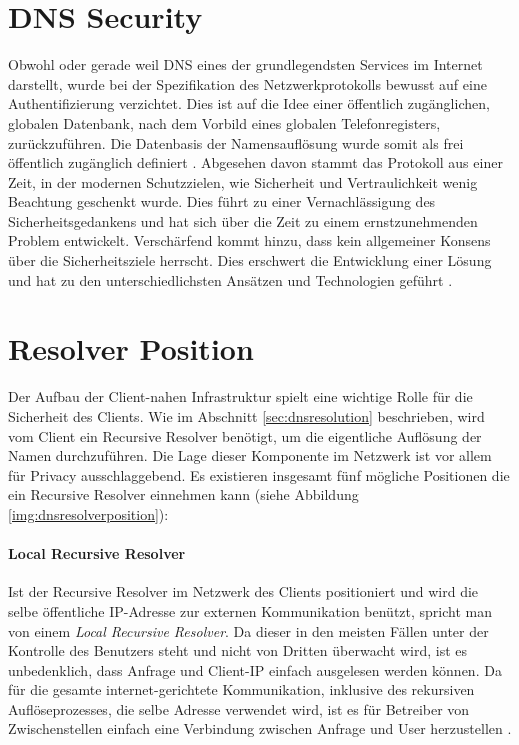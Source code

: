 \section{DNS Security}
\label{sec:dnssecurity}
Obwohl oder gerade weil DNS eines der grundlegendsten Services im Internet darstellt, wurde bei der Spezifikation des Netzwerkprotokolls bewusst auf eine Authentifizierung verzichtet. Dies ist auf die Idee einer öffentlich zugänglichen, globalen Datenbank, nach dem Vorbild eines globalen Telefonregisters, zurückzuführen. Die Datenbasis der Namensauflösung wurde somit als frei öffentlich zugänglich definiert \cite{rfc1035}. Abgesehen davon stammt das Protokoll aus einer Zeit, in der modernen Schutzzielen, wie Sicherheit und Vertraulichkeit wenig Beachtung geschenkt wurde. Dies führt zu einer Vernachlässigung des Sicherheitsgedankens und hat sich über die Zeit zu einem ernstzunehmenden Problem entwickelt. Verschärfend kommt hinzu, dass kein allgemeiner Konsens über die Sicherheitsziele herrscht. Dies erschwert die Entwicklung einer Lösung und hat zu den unterschiedlichsten Ansätzen und Technologien geführt \cite{Grothoff2018}.

\section{Resolver Position}
\label{sec:dnsresolverposition}
Der Aufbau der Client-nahen Infrastruktur spielt eine wichtige Rolle für die Sicherheit des Clients. Wie im Abschnitt \ref{sec:dnsresolution} beschrieben, wird vom Client ein Recursive Resolver benötigt, um die eigentliche Auflösung der Namen durchzuführen. Die Lage dieser Komponente im Netzwerk ist vor allem für Privacy ausschlaggebend. Es existieren insgesamt fünf mögliche Positionen die ein Recursive Resolver einnehmen kann \cite{VanHeugten2018} (siehe Abbildung \ref{img:dnsresolverposition}):

\paragraph{Local Recursive Resolver}
Ist der Recursive Resolver im Netzwerk des Clients positioniert und wird die selbe öffentliche IP-Adresse zur externen Kommunikation benützt, spricht man von einem \textit{Local Recursive Resolver}. Da dieser in den meisten Fällen unter der Kontrolle des Benutzers steht und nicht von Dritten überwacht wird, ist es unbedenklich, dass Anfrage und Client-IP einfach ausgelesen werden können. Da für die gesamte internet-gerichtete Kommunikation, inklusive des rekursiven Auflöseprozesses, die selbe Adresse verwendet wird, ist es für Betreiber von Zwischenstellen einfach eine Verbindung zwischen Anfrage und User herzustellen \cite{Shulman2014}.

